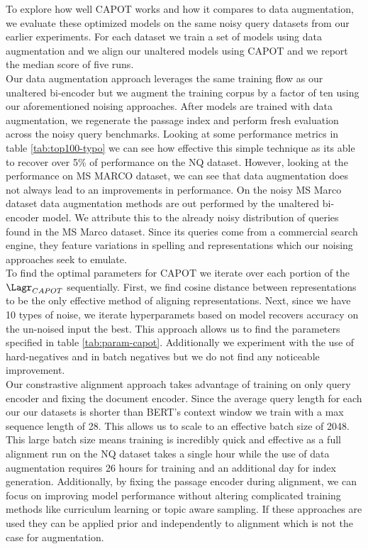 To explore how well CAPOT works and how it compares to data augmentation, we evaluate these optimized models on the same noisy query datasets from our earlier experiments. For each dataset we train a set of models using data augmentation and we align our unaltered models using CAPOT and we report the median score of five runs. \\
Our data augmentation approach leverages the same training flow as our unaltered bi-encoder but we augment the training corpus by a factor of ten using our aforementioned noising approaches. After models are trained with data augmentation, we regenerate the passage index and perform fresh evaluation across the noisy query benchmarks. Looking at some performance metrics in table \ref{tab:top100-typo} we can see how effective this simple technique as its able to recover over 5\% of performance on the NQ dataset. However, looking at the performance on MS MARCO dataset, we can see that data augmentation does not always lead to an improvements in performance. On the noisy MS Marco dataset data augmentation methods are out performed by the unaltered bi-encoder model. We attribute this to the already noisy distribution of queries found in the MS Marco dataset. Since its queries come from a commercial search engine, they feature variations in spelling and representations which our noising approaches seek to emulate.\\
To find the optimal parameters for CAPOT we iterate over each portion of the $\Lagr_{CAPOT}$ sequentially. First, we find cosine distance between representations to be the only effective method of aligning representations. Next, since we have 10 types of noise, we iterate hyperparamets based on model recovers accuracy on the un-noised input the best. This approach allows us to find the parameters specified in table \ref{tab:param-capot}. Additionally we experiment with the use of hard-negatives and in batch negatives but we do not find any noticeable improvement. \\
Our constrastive alignment approach takes advantage of training on only query encoder and fixing the document encoder. Since the average query length for each our our datasets is shorter than BERT's context window we train with a max sequence length of 28. This allows us to scale to an effective batch size of 2048. This large batch size means training is incredibly quick and effective as a full alignment run on the NQ dataset takes a single hour while the use of data augmentation requires 26 hours for training and an additional day for index generation. Additionally, by fixing the passage encoder during alignment, we can focus on improving model performance without altering complicated training methods like curriculum learning or topic aware sampling. If these approaches are used they can be applied prior and independently to alignment which is not the case for augmentation. \\ 
